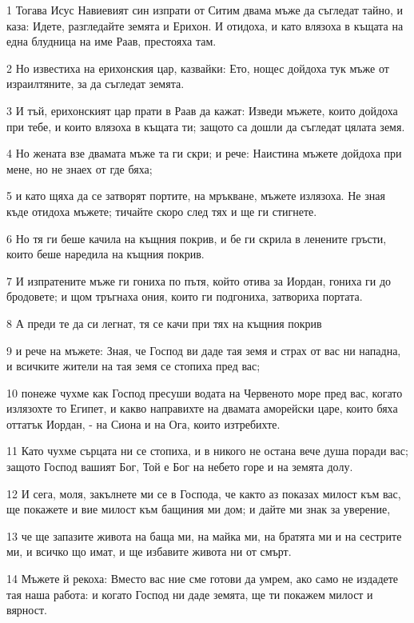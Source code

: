 \par 1 Тогава Исус Навиевият син изпрати от Ситим двама мъже да съгледат тайно, и каза: Идете, разгледайте земята и Ерихон. И отидоха, и като влязоха в къщата на една блудница на име Раав, престояха там.
\par 2 Но известиха на ерихонския цар, казвайки: Ето, нощес дойдоха тук мъже от израилтяните, за да съгледат земята.
\par 3 И тъй, ерихонският цар прати в Раав да кажат: Изведи мъжете, които дойдоха при тебе, и които влязоха в къщата ти; защото са дошли да съгледат цялата земя.
\par 4 Но жената взе двамата мъже та ги скри; и рече: Наистина мъжете дойдоха при мене, но не знаех от где бяха;
\par 5 и като щяха да се затворят портите, на мръкване, мъжете излязоха. Не зная къде отидоха мъжете; тичайте скоро след тях и ще ги стигнете.
\par 6 Но тя ги беше качила на къщния покрив, и бе ги скрила в ленените гръсти, които беше наредила на къщния покрив.
\par 7 И изпратените мъже ги гониха по пътя, който отива за Иордан, гониха ги до бродовете; и щом тръгнаха ония, които ги подгониха, затвориха портата.
\par 8 А преди те да си легнат, тя се качи при тях на къщния покрив
\par 9 и рече на мъжете: Зная, че Господ ви даде тая земя и страх от вас ни нападна, и всичките жители на тая земя се стопиха пред вас;
\par 10 понеже чухме как Господ пресуши водата на Червеното море пред вас, когато излязохте то Египет, и какво направихте на двамата аморейски царе, които бяха оттатък Иордан, - на Сиона и на Ога, които изтребихте.
\par 11 Като чухме сърцата ни се стопиха, и в никого не остана вече душа поради вас; защото Господ вашият Бог, Той е Бог на небето горе и на земята долу.
\par 12 И сега, моля, закълнете ми се в Господа, че както аз показах милост към вас, ще покажете и вие милост към бащиния ми дом; и дайте ми знак за уверение,
\par 13 че ще запазите живота на баща ми, на майка ми, на братята ми и на сестрите ми, и всичко що имат, и ще избавите живота ни от смърт.
\par 14 Мъжете й рекоха: Вместо вас ние сме готови да умрем, ако само не издадете тая наша работа: и когато Господ ни даде земята, ще ти покажем милост и вярност.
